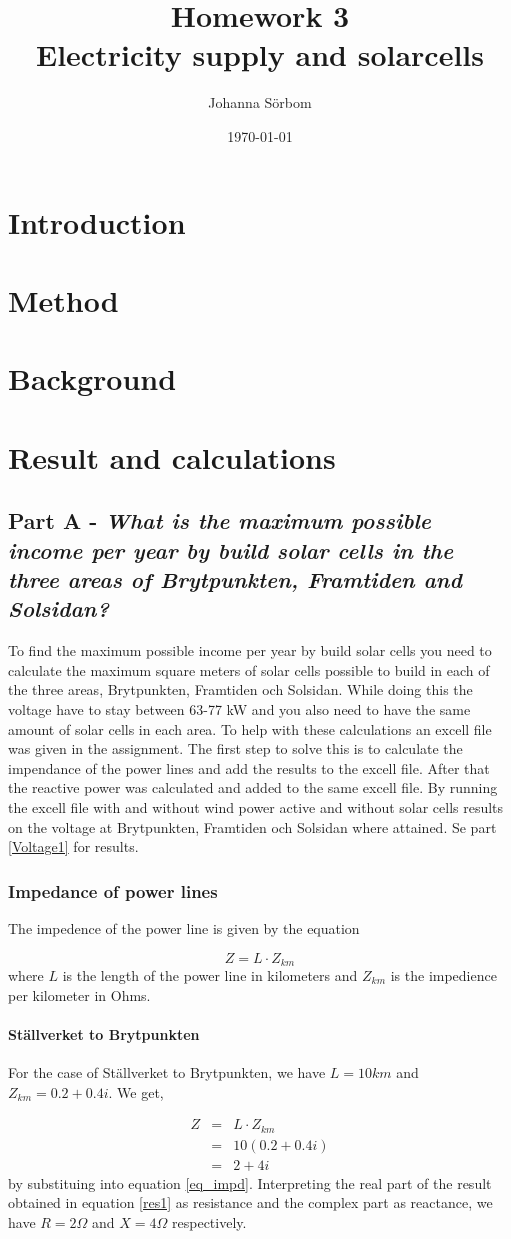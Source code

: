 \documentclass{report}
\title{Homework 3\\ Electricity supply and solarcells}
\date{\today}
\author{Johanna Sörbom}
\newcommand{\case}[1]{\subsubsection*{#1}}
\newcommand{\cmp}[2]{\ensuremath{#1+#2i}}
\newcommand{\mypart}[2]{\section*{Part #1 - \textit{#2}}}
\newcommand{\mysubpart}[1]{\subsection*{#1}}
\begin{document}
\maketitle
\chapter*{Introduction}
\chapter*{Method}
\chapter*{Background}
\chapter*{Result and calculations}
\mypart{A}{What is the maximum possible income per year by build solar cells in the three areas of Brytpunkten, Framtiden and Solsidan?}
To find the maximum possible income per year by build solar cells you need to calculate the maximum square meters of solar cells possible to build in each of the three areas, Brytpunkten, Framtiden och Solsidan. While doing this the voltage have to stay between 63-77 kW and you also need to have the same amount of solar cells in each area. To help with these calculations an excell file was given in the assignment. The first step to solve this is to calculate the impendance of the power lines and add the results to the excell file.  After that the reactive power was calculated and added to the same excell file. By running the excell file with and without wind power active and without solar cells results on the voltage at Brytpunkten, Framtiden och Solsidan where attained. Se part \ref{Voltage1} for results.  

\mysubpart{Impedance of power lines}
The impedence of the power line is given by the equation 

\begin{equation}\label{eq_impd}
Z =  L \cdot Z_{km}
\end{equation} where $L$ is the length of the power line in kilometers and $Z_{km}$ is the impedience per kilometer in Ohms.

\case{Ställverket to Brytpunkten}
For the case of Ställverket to Brytpunkten, we have $L=10km$ and $Z_{km}=\cmp{0.2}{0.4}$.  We get,

\begin{eqnarray}
Z&=&  L \cdot Z_{km} \\
&=&10 (\cmp{0.2}{0.4}) \\
&=& \cmp{2}{4} \label{res1}
\end{eqnarray} by substituing into equation \ref{eq_impd}. Interpreting the real part of the result obtained in equation \ref{res1} as resistance and the complex part as reactance, we have $R=2\Omega$ and $X=4\Omega$ respectively.
\end{document}
